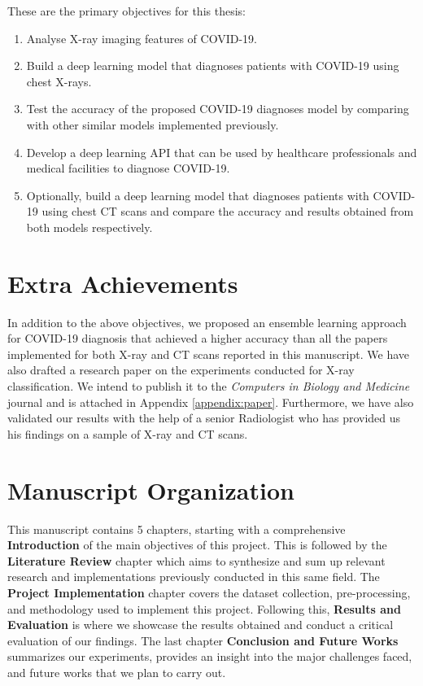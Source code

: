These are the primary objectives for this thesis:
\begin{enumerate}
    \item Analyse X-ray imaging features of COVID-19. 
    \item Build a deep learning model that diagnoses patients with COVID-19 using chest X-rays. 
    \item Test the accuracy of the proposed COVID-19 diagnoses model by comparing with other similar models implemented previously. 
    \item  Develop a deep learning API that can be used by healthcare professionals and medical facilities to diagnose COVID-19.
    \item Optionally, build a deep learning model that diagnoses patients with COVID-19 using chest CT scans and compare the accuracy and results obtained from both models respectively.
  \end{enumerate}
  
\section{Extra Achievements}

In addition to the above objectives, we proposed an ensemble learning approach for COVID-19 diagnosis that achieved a higher accuracy than all the papers implemented for both X-ray and CT scans reported in this manuscript. We have also drafted a research paper on the experiments conducted for X-ray classification. We intend to publish it to the \textit{Computers in Biology and Medicine} journal and is attached in Appendix \ref{appendix:paper}. Furthermore, we have also validated our results with the help of a senior Radiologist who has provided us his findings on a sample of X-ray and CT scans.

\section{Manuscript Organization}

This manuscript contains 5 chapters, starting with a comprehensive \textbf{Introduction} 
of the main objectives of this project. This is followed by the 
\textbf{Literature Review} chapter which aims to synthesize and sum up relevant research and implementations previously conducted in this same field. The \textbf{Project Implementation} chapter covers the dataset collection, pre-processing, and methodology used to implement this project. Following this, \textbf{Results and Evaluation} is where we showcase the results obtained and conduct a critical evaluation of our findings. The last chapter \textbf{Conclusion and Future Works} summarizes our experiments, provides an insight into the major challenges faced, and future works that we plan to carry out.